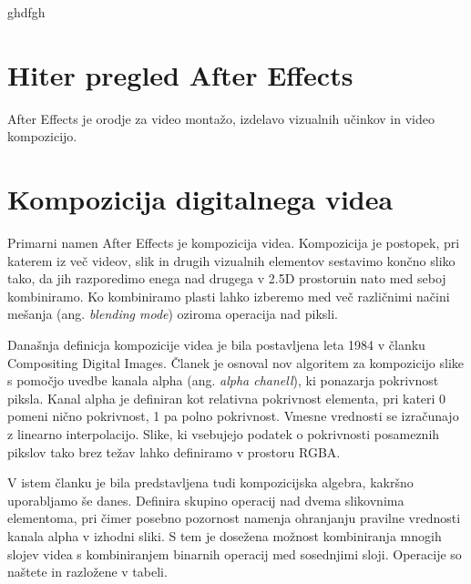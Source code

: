 \documentclass[a4paper, 12pt]{book}
\begin{document}
ghdfgh

\section{Hiter pregled After Effects}

After Effects je orodje za video montažo, izdelavo vizualnih učinkov in video kompozicijo.

\section{Kompozicija digitalnega videa}

Primarni namen After Effects je kompozicija videa.
Kompozicija je postopek, pri katerem iz več videov, slik in drugih vizualnih elementov sestavimo končno sliko tako,
da jih razporedimo enega nad drugega v 2.5D prostoru\footnotemark in nato med seboj kombiniramo\cite{siggraphcomposition}.
Ko kombiniramo plasti lahko izberemo med več različnimi načini mešanja (ang. {\it blending mode}) oziroma operacija nad piksli.

Današnja definicja kompozicije videa je bila postavljena leta 1984 v članku Compositing Digital Images\cite{siggraphcompostition}.
Članek je osnoval nov algoritem za kompozicijo slike s pomočjo uvedbe kanala alpha (ang. {\it alpha chanell}), ki ponazarja pokrivnost piksla.
Kanal alpha je definiran kot relativna pokrivnost elementa, pri kateri 0 pomeni nično pokrivnost, 1 pa polno pokrivnost.
Vmesne vrednosti se izračunajo z linearno interpolacijo.
Slike, ki vsebujejo podatek o pokrivnosti posameznih pikslov tako brez težav lahko definiramo v prostoru RGBA.

V istem članku je bila predstavljena tudi kompozicijska algebra, kakršno uporabljamo še danes.
Definira skupino operacij nad dvema slikovnima elementoma, pri čimer posebno pozornost namenja ohranjanju pravilne vrednosti kanala alpha v izhodni sliki.
S tem je dosežena možnost kombiniranja mnogih slojev videa s kombiniranjem binarnih operacij med sosednjimi sloji.
Operacije so naštete in razložene v tabeli. %
\end{document}
